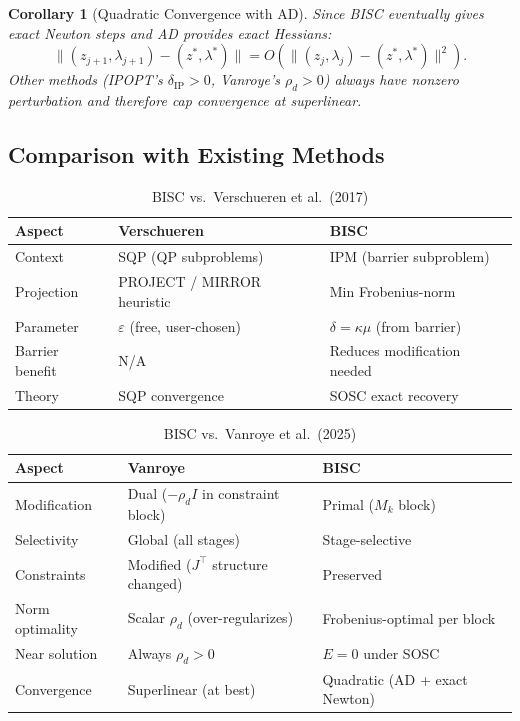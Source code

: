 \documentclass[11pt]{article}
\newtheorem{corollary}[theorem]{Corollary}
\begin{document}
\begin{corollary}[Quadratic Convergence with AD]\label{cor:quadratic}
Since BISC eventually gives exact Newton steps and AD provides exact Hessians:
\begin{equation}
  \|(z_{j+1}, \lambda_{j+1}) - (z^*, \lambda^*)\|
  = O\!\left(\|(z_j, \lambda_j) - (z^*, \lambda^*)\|^2\right).
\end{equation}
Other methods (IPOPT's $\delta_{\mathrm{IP}} > 0$, Vanroye's $\rho_d > 0$)
always have nonzero perturbation and therefore cap convergence at superlinear.
\end{corollary}


\subsection{Comparison with Existing Methods}

\begin{table}[h]
\centering
\caption{BISC vs.\ Verschueren et al.\ (2017)}
\begin{tabular}{lll}
\toprule
\textbf{Aspect} & \textbf{Verschueren} & \textbf{BISC} \\
\midrule
Context & SQP (QP subproblems) & IPM (barrier subproblem) \\
Projection & PROJECT / MIRROR heuristic & Min Frobenius-norm \\
Parameter & $\varepsilon$ (free, user-chosen) & $\delta = \kappa\mu$ (from barrier) \\
Barrier benefit & N/A & Reduces modification needed \\
Theory & SQP convergence & SOSC exact recovery \\
\bottomrule
\end{tabular}
\end{table}

\begin{table}[h]
\centering
\caption{BISC vs.\ Vanroye et al.\ (2025)}
\begin{tabular}{lll}
\toprule
\textbf{Aspect} & \textbf{Vanroye} & \textbf{BISC} \\
\midrule
Modification & Dual ($-\rho_d I$ in constraint block) & Primal ($M_k$ block) \\
Selectivity & Global (all stages) & Stage-selective \\
Constraints & Modified ($J^\top$ structure changed) & Preserved \\
Norm optimality & Scalar $\rho_d$ (over-regularizes) & Frobenius-optimal per block \\
Near solution & Always $\rho_d > 0$ & $E = 0$ under SOSC \\
Convergence & Superlinear (at best) & Quadratic (AD + exact Newton) \\
\bottomrule
\end{tabular}
\end{table}
\end{document}
